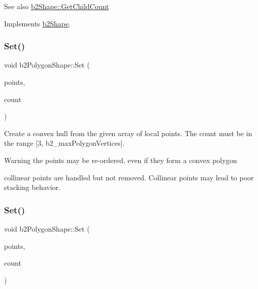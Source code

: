 \begin{DoxySeeAlso}{See also}
\hyperlink{classb2Shape_a05a3c445017d96df9238ceefe6ce37ab}{b2\+Shape\+::\+Get\+Child\+Count} 
\end{DoxySeeAlso}


Implements \hyperlink{classb2Shape_a05a3c445017d96df9238ceefe6ce37ab}{b2\+Shape}.

\mbox{\label{classb2PolygonShape_a4d7b35550509f570814b97325a68966b}} 
\subsubsection{\texorpdfstring{Set()}{Set()}\hspace{0.1cm}{\footnotesize\ttfamily [1/2]}}
{\footnotesize\ttfamily void b2\+Polygon\+Shape\+::\+Set (\begin{DoxyParamCaption}\item[{const \hyperlink{structb2Vec2}{b2\+Vec2} $\ast$}]{points,  }\item[{int32}]{count }\end{DoxyParamCaption})}

Create a convex hull from the given array of local points. The count must be in the range \mbox{[}3, b2\+\_\+max\+Polygon\+Vertices\mbox{]}. \begin{DoxyWarning}{Warning}
the points may be re-\/ordered, even if they form a convex polygon 

collinear points are handled but not removed. Collinear points may lead to poor stacking behavior. 
\end{DoxyWarning}
\mbox{\label{classb2PolygonShape_a4d7b35550509f570814b97325a68966b}} 
\subsubsection{\texorpdfstring{Set()}{Set()}\hspace{0.1cm}{\footnotesize\ttfamily [2/2]}}
{\footnotesize\ttfamily void b2\+Polygon\+Shape\+::\+Set (\begin{DoxyParamCaption}\item[{const \hyperlink{structb2Vec2}{b2\+Vec2} $\ast$}]{points,  }\item[{int32}]{count }\end{DoxyParamCaption})}

